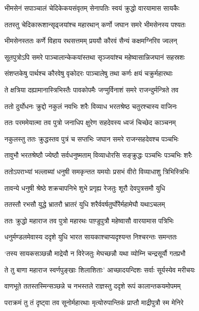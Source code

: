 \twolineshloka
{भीमसेनं सपाञ्चालं चेदिकेकयसंवृतम्}
{सेनापतिः स्वयं क्रुद्धो वारयामास सायकैः}


\twolineshloka
{ततस्तु चेदिकारूशान्सृढ्जयांश्च महारथान्}
{कर्णो जघान समरे भीमसेनस्य पश्यतः}


\twolineshloka
{भीमसेनस्ततः कर्णे विहाय रथसत्तमम्}
{प्रययौ कौरवं सैन्यं कक्षमग्निरिव ज्वलन्}


\twolineshloka
{सूतपुत्रोऽपि समरे पाञ्चालान्केकयांस्तथा}
{सृञ्जयांश्च महेष्वासान्निजघानं सहस्रशः}


\twolineshloka
{संशप्तकेषु पार्थश्च कौरवेषु वृकोदरः}
{पाञ्चालेषु तथा कर्णः क्षयं चक्रुर्महारथाः}


\twolineshloka
{ते क्षत्रिया दह्यामानास्त्रिभिस्तैः पावकोपमैः}
{जग्मुर्विनाशं समरे राजन्दुर्मन्त्रिते तव}


\twolineshloka
{ततो दुर्योधनः क्रुद्दो नकुलं नवभिः शरैः}
{विव्याध भरतश्रेष्ठ चतुरश्चास्य वाजिनः}


\twolineshloka
{ततः परममेयात्मा तव पुत्रो जनाधिप}
{क्षुरेण सहदेवस्य ध्वजं चिच्छेद काञ्चनम्}


\twolineshloka
{नकुलस्तु ततः क्रुद्धस्तव पुत्रं च सप्तभिः}
{जघान समरे राजन्सहदेवश्च पञ्चभिः}


\twolineshloka
{तावुभौ भरतश्रेष्ठौ ज्येष्ठौ सर्वधनुष्मताम्}
{विव्याधोरसि सङ्क्रुद्धः पञ्चभिः पञ्चभिः शरैः}


\twolineshloka
{ततोऽपराभ्यां भल्लाब्यां धनुषी समकृन्तत}
{यमयोः प्रसभं वीरो विव्याधाशु त्रिभिस्त्रिभिः}


\twolineshloka
{तावन्ये धनुषी श्रेष्ठे शक्रचापनिभे शुभे}
{प्रगृह्य रेजतुः शूरौ देवपुत्रसमौ युधि}


\twolineshloka
{ततस्तौ रभसौ युद्धे भ्रातरौ भ्रातरं युधि}
{शरैर्ववर्षतुर्घोरैर्महामेघौ यथाऽचलम्}


\twolineshloka
{ततः क्रुद्धो महाराज तव पुत्रो महारथः}
{पाण़्डुपुत्रौ महेष्वासौ वारयामास पत्रिभिः}


\twolineshloka
{धनुर्मण्डलमेवास्य ददृशे युधि भारत}
{सायकाश्चाप्यदृश्यन्त निश्चरन्तः समन्ततः}


\twolineshloka
{`तस्य सायकसञ्छन्नौ माद्रेयौ न विरेजतुः}
{मेघच्छन्नौ यथा व्योम्नि चन्द्रसूर्यौ गतप्रभौ}


\twolineshloka
{ते तु बाणा महाराज स्वर्णपुङ्खाः शिलाशिताः'}
{आच्छादयन्दिशः सर्वाः सूर्यस्येव मरीचयः}


\twolineshloka
{वाणभूते ततस्तस्मिन्सञ्छन्ने च नभस्तले}
{राज्ञस्तु ददृशे रूपं कालान्तकयमोपमम्}


\twolineshloka
{पराक्रमं तु तं दृष्ट्वा तव सूनोर्महारथाः}
{मृत्योरुपान्तिकं प्राप्तौ माद्रीपुत्रौ स्म मेनिरे}


